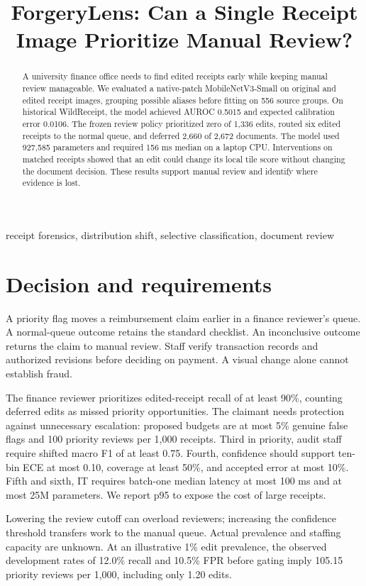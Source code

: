 \documentclass[conference]{IEEEtran}
\title{ForgeryLens: Can a Single Receipt Image Prioritize Manual Review?}
\author{\IEEEauthorblockN{Mohsin Saeed, Hamza Sami, and M. Taha}\IEEEauthorblockA{Ghulam Ishaq Khan Institute of Engineering Sciences and Technology, Pakistan\\AI341 Deep Neural Networks}}
\begin{document}
\maketitle
\begin{abstract}
A university finance office needs to find edited receipts early while keeping manual review manageable. We evaluated a native-patch MobileNetV3-Small on original and edited receipt images, grouping possible aliases before fitting on 556 source groups. On historical WildReceipt, the model achieved AUROC 0.5015 and expected calibration error 0.0106. The frozen review policy prioritized zero of 1,336 edits, routed six edited receipts to the normal queue, and deferred 2,660 of 2,672 documents. The model used 927,585 parameters and required 156 ms median on a laptop CPU. Interventions on matched receipts showed that an edit could change its local tile score without changing the document decision. These results support manual review and identify where evidence is lost.
\end{abstract}
\begin{IEEEkeywords}
receipt forensics, distribution shift, selective classification, document review
\end{IEEEkeywords}
\section{Decision and requirements}
A priority flag moves a reimbursement claim earlier in a finance reviewer's queue. A normal-queue outcome retains the standard checklist. An inconclusive outcome returns the claim to manual review. Staff verify transaction records and authorized revisions before deciding on payment. A visual change alone cannot establish fraud.

The finance reviewer prioritizes edited-receipt recall of at least 90\%, counting deferred edits as missed priority opportunities. The claimant needs protection against unnecessary escalation: proposed budgets are at most 5\% genuine false flags and 100 priority reviews per 1,000 receipts. Third in priority, audit staff require shifted macro F1 of at least 0.75. Fourth, confidence should support ten-bin ECE at most 0.10, coverage at least 50\%, and accepted error at most 10\%. Fifth and sixth, IT requires batch-one median latency at most 100 ms and at most 25M parameters. We report p95 to expose the cost of large receipts.

Lowering the review cutoff can overload reviewers; increasing the confidence threshold transfers work to the manual queue. Actual prevalence and staffing capacity are unknown. At an illustrative 1\% edit prevalence, the observed development rates of 12.0\% recall and 10.5\% FPR before gating imply 105.15 priority reviews per 1,000, including only 1.20 edits.
\end{document}
